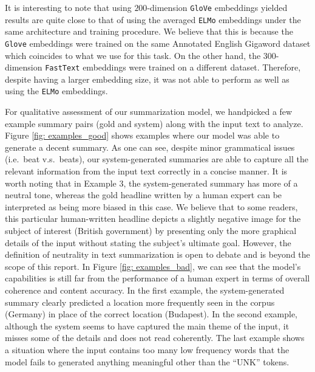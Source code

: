 It is interesting to note that using $200$-dimension \texttt{GloVe} embeddings yielded results are quite close to that of using the averaged \texttt{ELMo} embeddings under the same architecture and training procedure. We believe that this is because the \texttt{Glove} embeddings were trained on the same Annotated English Gigaword dataset which coincides to what we use for this task. On the other hand, the $300$-dimension \texttt{FastText} embeddings were trained on a different dataset. Therefore, despite having a larger embedding size, it was not able to perform as well as using the \texttt{ELMo} embeddings.

For qualitative assessment of our summarization model, we handpicked a few example summary pairs (gold and system) along with the input text to analyze. Figure \ref{fig: examples_good} shows examples where our model was able to generate a decent summary. As one can see, despite minor grammatical issues (i.e.\ beat v.s.\ beats), our system-generated summaries are able to capture all the relevant information from the input text correctly in a concise manner. It is worth noting that in Example 3, the system-generated summary has more of a neutral tone, whereas the gold headline written by a human expert can be interpreted as being more biased in this case. We believe that to some readers, this particular human-written headline depicts a slightly negative image for the subject of interest (British government) by presenting only the more graphical details of the input without stating the subject's ultimate goal. However, the definition of neutrality in text summarization is open to debate and is beyond the scope of this report. In Figure \ref{fig: examples_bad}, we can see that the model's capabilities is still far from the performance of a human expert in terms of overall coherence and content accuracy. In the first example, the system-generated summary clearly predicted a location more frequently seen in the corpus (Germany) in place of the correct location (Budapest). In the second example, although the system seems to have captured the main theme of the input, it misses some of the details and does not read coherently. The last example shows a situation where the input contains too many low frequency words that the model fails to generated anything meaningful other than the ``UNK'' tokens. 


